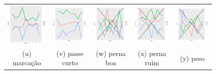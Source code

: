 \documentclass[review]{elsarticle}
\begin{document}
\begin{figure}[!bp]
\begin{tabular}{ccccc}
   \includegraphics[width=25mm]{marcacao_result} & \includegraphics[width=25mm]{passecurto_result}   &   \includegraphics[width=25mm]{pernaboa_result}&
  \includegraphics[width=25mm]{pernaruim_result}   & \includegraphics[width=25mm]{peso_result}   \\
 \scriptsize{(u) marcação} & \scriptsize{(v) passe curto } & \scriptsize{(w) perna boa} & \scriptsize{(x) perna ruim} & \scriptsize{(y) peso}\\[3pt]
 

\end{tabular}
\end{figure}
\end{document}
